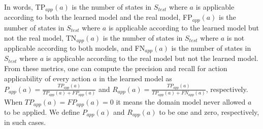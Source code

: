 \documentclass[letterpaper]{article} %
\newcommand{\app}{\ensuremath{\textit{app}}\xspace}
\newcommand{\stest}{\ensuremath{S_{\textit{test}}}\xspace}
\newif\ifaddcomments
\newcommand{\roni}[1]{\ifaddcomments{\textcolor{red}{[Roni: #1]}}\fi}
\newcommand{\argaman}[1]{\ifaddcomments{\textcolor{blue}{[Argaman: #1]}}\fi}
\newcommand{\pascalJr}[1]{\ifaddcomments{\textcolor{cyan}{[Pascal L.: {#1}]}}\fi}
\begin{document}
In words, TP$_{\app}(a)$ is the number of states in \stest where $a$ is applicable according to both the learned model and the real model, FP$_{\app}(a)$ is the number of states in $\stest$ where $a$ is applicable according to the learned model but not the real model, TN$_{\app}(a)$ is the number of states in $\stest$ where $a$ is not applicable according to both models, and FN$_{\app}(a)$ is the number of states in $\stest$ 
where $a$ is applicable according to the real model but not the learned model. 
From these metrics, one can compute the precision and recall 
for action applicability
of every action $a$ in the learned model as 
$P_{\app}(a)= \frac{TP_{\app}(a)}{TP_{\app}(a)+FP_{\app}(a)}$ 
and $R_{\app}(a)= \frac{TP_{\app}(a)}{TP_{\app}(a)+FN_{\app}(a)}$, 
respectively. 
When $TP_{\app}(a)=FP_{\app}(a)=0$ it means the domain model never allowed $a$ to be applied. We define $P_{\app}(a)$ and $R_{\app}(a)$ to be one and zero, respectively, in such cases. %






\end{document}
